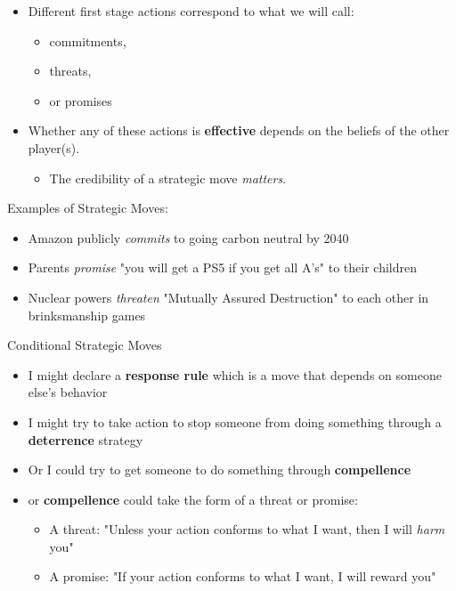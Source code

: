 \documentclass{beamer}
\theoremstyle{plain}
\begin{document}
\begin{frame}{}
  \begin{itemize}
    \item Different first stage actions correspond to what we will call:
    \begin{itemize}
      \item \alert{commitments},
      \item \alert{threats},
      \item or \alert{promises}
    \end{itemize}
    \item Whether any of these actions is \textbf{effective}
    depends on the beliefs of the other player(s).
    \begin{itemize}
      \item The \alert{credibility} of a strategic move \textit{matters}.
    \end{itemize}
  \end{itemize} 
\end{frame}


\begin{frame}{}
  Examples of Strategic Moves:
  \begin{itemize}
    \item Amazon publicly \textit{commits} to going carbon neutral by 2040
    \item Parents \textit{promise} "you will get a PS5 if you get all A's" 
    to their children
    \item Nuclear powers \textit{threaten} "Mutually Assured Destruction"
    to each other in \alert{brinksmanship} games
  \end{itemize}
\end{frame}


\begin{frame}{}
  Conditional Strategic Moves 
  \begin{itemize}
    \item I might declare a \textbf{response rule} 
    which is a move that depends on someone else's behavior
    \item I might try to take action to stop someone from doing something 
    through a \textbf{deterrence} strategy
    \item Or I could try to get someone to do something 
    through \textbf{compellence}
    \item {} or \textbf{compellence} could take the form 
    of a \alert{threat} or \alert{promise}:
    \begin{itemize}
      \item A \alert{threat}: 
      "Unless your action conforms to what I want, then I will \textit{harm} you"
      \item A \alert{promise}:
      "If your action conforms to what I want, I will \alert{reward} you"
    \end{itemize}
  \end{itemize}
\end{frame}
\end{document}
